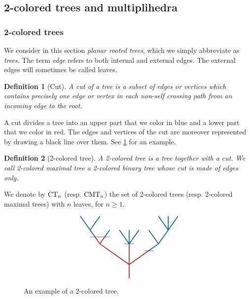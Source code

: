 \documentclass[twoside, 11pt]{amsart}
\newtheorem{definition}{Definition}[section]
\theoremstyle{remark}
\begin{document}

\subsection{2-colored trees and multiplihedra}

\subsubsection{2-colored trees}

We consider in this section \textit{planar rooted trees}, which we simply abbreviate as \textit{trees}. The term \emph{edge} refers to both internal and external edges. The external edges will sometimes be called leaves. 

\begin{definition}[Cut]
A \emph{cut} of a tree is a subset of edges or vertices which contains precisely one edge or vertex in each non-self crossing path from an incoming edge to the root.
\end{definition}

\noindent A cut divides a tree into an upper part that we color in blue and a lower part that we color in red. The edges and vertices of the cut are moreover represented by drawing a black line over them. See \cref{Fig1:2ColTree} for an example. 

\begin{definition}[2-colored tree] \label{def:2coloredtree}
A \emph{2-colored tree} is a tree together with a cut. We call \emph{2-colored maximal tree} a 2-colored binary tree whose cut is made of edges only. 
\end{definition}
\noindent We denote by $\mathrm{CT}_{n}$ (resp. $\mathrm{CMT}_{n}$) the set of 2-colored trees (resp. 2-colored maximal trees) with $n$ leaves, for $n\geq 1$. 

\begin{figure}[h]
\[\vcenter{\hbox{
\begin{tikzpicture}[yscale=0.7,xscale=1]
\draw[very thick, MidnightBlue] (-2.5,3.5)--(-2,2.5);
\draw[very thick, MidnightBlue] (-1.5,3.5)--(-2,2.5);
\draw[very thick, MidnightBlue] (-2,2.5) -- (-1.75,2);
\draw[very thick, MidnightBlue] (-1.25, 2) -- (-1,2.5);
\draw[very thick, MidnightBlue] (-0.5,2.5) -- (0,1.5);
\draw[very thick, MidnightBlue] (0,1.5)--(0,2.5);
\draw[very thick, MidnightBlue] (0,1.5)--(0.5,2.5);
\draw[very thick, MidnightBlue] (1,1)--(1.5,1.5);
\draw[very thick, MidnightBlue] (1.5,1.5)--(1,2.5);
\draw[very thick, MidnightBlue] (1.5,1.5)--(2,2.5);
\draw[very thick, MidnightBlue] (2,2.5)--(1.5,3.5);
\draw[very thick, MidnightBlue] (2,2.5)--(2,3.5);
\draw[very thick, MidnightBlue] (2,2.5)--(2.5,3.5);
\draw[very thick, BrickRed] (0,-1)--(0, 1.5); 
\draw[very thick, BrickRed] (0,0)--(-1.5,1.5);
\draw[very thick, BrickRed] (-1.5,1.5)--(-1.75, 2); 
\draw[very thick, BrickRed] (-1.5,1.5)--(-1.25, 2); 
\draw[very thick, BrickRed] (0,0)--(1, 1);
\draw (-2,2) to (-1,2); 
\draw (-0.25,1.5)-- (0.25, 1.5) ; 
\draw (0.75,1) to (1.25,1);
\end{tikzpicture}}}\]
\caption{An example of a 2-colored tree.}
\label{Fig1:2ColTree}
\end{figure}
\end{document}
